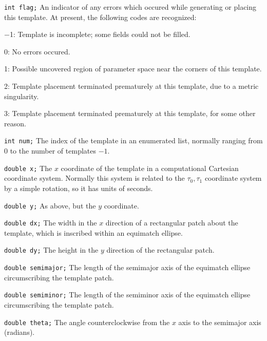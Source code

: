 \begin{description}
\item{\tt int flag;}
  An indicator of any errors which occured while generating or placing
  this template.  At present, the following codes are recognized:
  \begin{description}
  \item{$-$1:}
    Template is incomplete; some fields could not be filled.
  \item{0:}
    No errors occured.
  \item{1:}
    Possible uncovered region of parameter space near the corners of
    this template.
  \item{2:}
    Template placement terminated prematurely at this template, due to
    a metric singularity.
  \item{3:}
    Template placement terminated prematurely at this template, for
    some other reason.
  \end{description}

\item{\tt int num;}
  The index of the template in an enumerated list, normally ranging
  from 0 to the number of templates $-1$.

\item{\tt double x;}
  The $x$ coordinate of the template in a computational Cartesian
  coordinate system.  Normally this system is related to the
  $\tau_0,\tau_1$ coordinate system by a simple rotation, so it has
  units of seconds.

\item{\tt double y;}
  As above, but the $y$ coordinate.

\item{\tt double dx;}
  The width in the $x$ direction of a rectangular patch about the
  template, which is inscribed within an equimatch ellipse.

\item{\tt double dy;}
  The height in the $y$ direction of the rectangular patch.

\item{\tt double semimajor;}
  The length of the semimajor axis of the equimatch ellipse
  circumscribing the template patch.

\item{\tt double semiminor;}
  The length of the semiminor axis of the equimatch ellipse
  circumscribing the template patch.

\item{\tt double theta;}
  The angle counterclockwise from the $x$ axis to the semimajor axis
  (radians).


\end{description}

